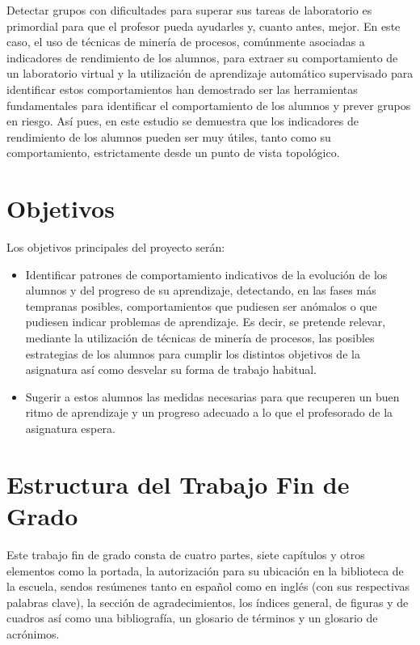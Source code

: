 Detectar grupos con dificultades para superar sus tareas de laboratorio es primordial para que el profesor pueda ayudarles y, cuanto antes, mejor. En este caso, el uso de técnicas de minería de procesos, comúnmente asociadas a indicadores de rendimiento de los alumnos, para extraer su comportamiento de un laboratorio virtual y la utilización de aprendizaje automático supervisado para identificar estos comportamientos han demostrado ser las herramientas fundamentales para identificar el comportamiento de los alumnos y prever grupos en riesgo. Así pues, en este estudio se demuestra que los indicadores de rendimiento de los alumnos pueden ser muy útiles, tanto como su comportamiento, estrictamente desde un punto de vista topológico.

\section{Objetivos}

Los objetivos principales del proyecto serán:
\begin{itemize}
\item Identificar patrones de comportamiento indicativos de la evolución de los alumnos y del progreso de su aprendizaje, detectando, en las fases más tempranas posibles, comportamientos que pudiesen ser anómalos o que pudiesen indicar problemas de aprendizaje. Es decir, se pretende relevar, mediante la utilización de técnicas de minería de procesos, las posibles estrategias de los alumnos para cumplir los distintos objetivos de la asignatura así como desvelar su forma de trabajo habitual.
\item Sugerir a estos alumnos las medidas necesarias para que recuperen un buen ritmo de aprendizaje y un progreso adecuado a lo que el profesorado de la asignatura espera.
\end{itemize}

\section{Estructura del Trabajo Fin de Grado}

Este trabajo fin de grado consta de cuatro partes, siete capítulos y otros elementos como la portada, la autorización para su ubicación en la biblioteca de la escuela, sendos resúmenes tanto en español como en inglés (con sus respectivas palabras clave), la sección de agradecimientos, los índices general, de figuras y de cuadros así como una bibliografía, un glosario de términos y un glosario de acrónimos.

